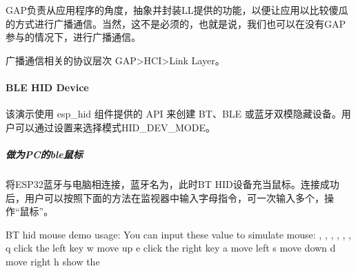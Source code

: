 \documentclass[a4paper,12pt,english]{sphinxmanual}
\begin{document}
{{\sphinxAtStartPar
GAP负责从应用程序的角度，抽象并封装LL提供的功能，以便让应用以比较傻瓜的方式进行广播通信。当然，这不是必须的，也就是说，我们也可以在没有GAP参与的情况下，进行广播通信。

\sphinxAtStartPar
广播通信相关的协议层次 GAP>HCI>Link Layer。

\sphinxAtStartPar
{}


\paragraph{BLE HID Device}
\label{\detokenize{exp-esp32/bluetooth/hid-gap:ble-hid-device}}
\sphinxAtStartPar
该演示使用 esp\_hid 组件提供的 API 来创建 BT、BLE 或蓝牙双模隐藏设备。用户可以通过设置来选择模式HID\_DEV\_MODE。


\subparagraph{做为PC的ble鼠标}
\label{\detokenize{exp-esp32/bluetooth/hid-gap:pcble}}
\sphinxAtStartPar
将ESP32蓝牙与电脑相连接，蓝牙名为，此时BT HID设备充当鼠标。连接成功后，用户可以按照下面的方法在监视器中输入字母指令，可一次输入多个，操作“鼠标”。

\begin{sphinxVerbatim}[commandchars=\\\{\}]
BT hid mouse demo usage:
You can input these value to simulate mouse: , , , , , , 
q \PYGZhy{}\PYGZhy{} click the left key
w \PYGZhy{}\PYGZhy{} move up
e \PYGZhy{}\PYGZhy{} click the right key
a \PYGZhy{}\PYGZhy{} move left
s \PYGZhy{}\PYGZhy{} move down
d \PYGZhy{}\PYGZhy{} move right
h \PYGZhy{}\PYGZhy{} show the 
\end{sphinxVerbatim}


}}
\end{document}
